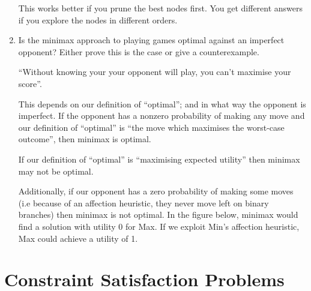 \documentclass[10pt,\jkfside,a4paper]{article}
\begin{document}
\begin{enumerate}
{\color{blue}
This works better if you prune the best nodes first. You get different
answers if you explore the nodes in different orders.
}

\setcounter{enumi}{2}

\item Is the minimax approach to playing games optimal against an imperfect
opponent? Either prove this is the case or give a counterexample.

{\color{blue}
``Without knowing your your opponent will play, you can't maximise your
score''.
}

This depends on our definition of ``optimal''; and in what way the opponent
is imperfect. If the opponent has a nonzero probability of making any move
and our definition of ``optimal'' is ``the move which maximises the
worst-case outcome'', then minimax is optimal.

If our definition of ``optimal'' is ``maximising expected utility'' then
minimax may not be optimal.

Additionally, if our opponent has a zero probability of making some moves (i.e
because of an affection heuristic, they never move left on binary branches)
then minimax is not optimal. In the figure below, minimax would find a
solution with utility 0 for Max. If we exploit Min's affection heuristic,
Max could achieve a utility of 1.

\begin{figure}[H]
\centering
{}
\end{figure}

\end{enumerate}

\section{Constraint Satisfaction Problems}
\end{document}
